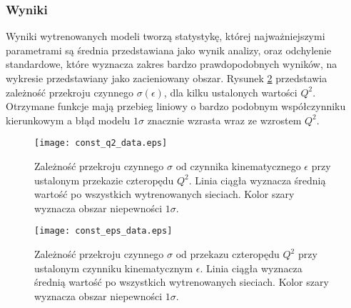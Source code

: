 \documentclass[11pt]{book}
\theoremstyle{definition}
\begin{document}
\subsubsection{Wyniki}
%
Wyniki wytrenowanych modeli tworzą statystykę, której najważniejszymi parametrami są średnia przedstawiana jako wynik analizy, oraz odchylenie standardowe, które wyznacza zakres bardzo prawdopodobnych wyników, na wykresie przedstawiany jako zacieniowany obszar.
Rysunek \ref{fig:const_eps} przedstawia zależność przekroju czynnego $\sigma\left(\epsilon\right)$, dla kilku ustalonych wartości $Q^2$. Otrzymane funkcje mają przebieg liniowy o bardzo podobnym współczynniku kierunkowym a błąd modelu $1\sigma$ znacznie wzrasta wraz ze wzrostem $Q^2$.
%
%
\begin{figure}[htp!]
	\centering
	\texttt{[image: const\_q2\_data.eps]}
	\caption{Zależność przekroju czynnego $\sigma$ od czynnika kinematycznego $\epsilon$ przy ustalonym przekazie czteropędu $Q^2$. Linia ciągła wyznacza średnią wartość po wszystkich wytrenowanych sieciach. Kolor szary wyznacza obszar niepewności $1\sigma$.} 
	\label{fig:const_q2}
\end{figure}
%
%
\begin{figure}[htp!]
	\centering
	\texttt{[image: const\_eps\_data.eps]}
	\caption{Zależność przekroju czynnego $\sigma$ od przekazu czteropędu $Q^2$ przy ustalonym czynniku kinematycznym $\epsilon$. Linia ciągła wyznacza średnią wartość po wszystkich wytrenowanych sieciach. Kolor szary wyznacza obszar niepewności $1\sigma$.} 
	\label{fig:const_eps}
\end{figure}
%
\end{document}
